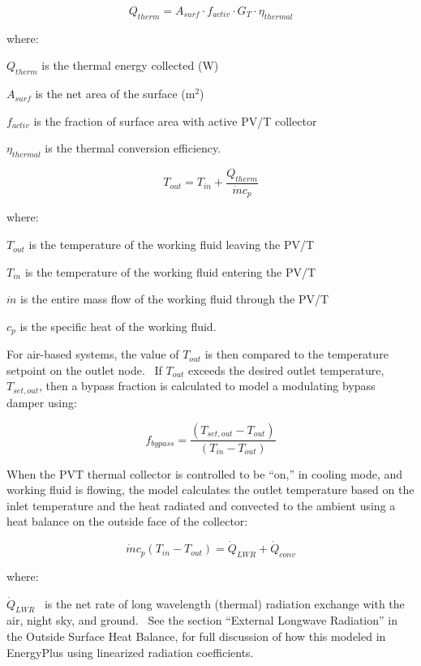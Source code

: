 \begin{equation}
{Q_{therm}} = {A_{surf}} \cdot {f_{activ}} \cdot {G_T} \cdot {\eta_{thermal}}
\end{equation}

where:

\({Q_{therm}}\) is the thermal energy collected (W)

\({A_{surf}}\) is the net area of the surface (m\(^{2}\))

\({f_{activ}}\) is the fraction of surface area with active PV/T collector

\({\eta_{thermal}}\) is the thermal conversion efficiency.

\begin{equation}
{T_{out}} = {T_{in}} + \frac{{{Q_{therm}}}}{{\dot m{c_p}}}
\end{equation}

where:

\({T_{out}}\) is the temperature of the working fluid leaving the PV/T

\({T_{in}}\) is the temperature of the working fluid entering the PV/T

\(\dot m\) is the entire mass flow of the working fluid through the PV/T

\({c_p}\) is the specific heat of the working fluid.

For air-based systems, the value of \({T_{out}}\) is then compared to the temperature setpoint on the outlet node.~ If \({T_{out}}\) exceeds the desired outlet temperature, \({T_{set,out}}\), then a bypass fraction is calculated to model a modulating bypass damper using:

\begin{equation}
{f_{bypass}} = \frac{{\left( {{T_{set,out}} - {T_{out}}} \right)}}{{\left( {{T_{in}} - {T_{out}}} \right)}}
\end{equation}

When the PVT thermal collector is controlled to be ``on,'' in cooling mode, and working fluid is flowing, the model calculates the outlet temperature based on the inlet temperature and the heat radiated and convected to the ambient using a heat balance on the outside face of the collector:

\begin{equation}
\dot m{c_p}\left( {{T_{in}} - {T_{out}}} \right) = {\dot Q_{LWR}} + {\dot Q_{conv}}
\end{equation}

where:

\({\dot Q_{LWR}}\) ~is the net rate of long wavelength (thermal) radiation exchange with the air, night sky, and ground.~ See the section ``External Longwave Radiation'' in the Outside Surface Heat Balance, for full discussion of how this modeled in EnergyPlus using linearized radiation coefficients.

